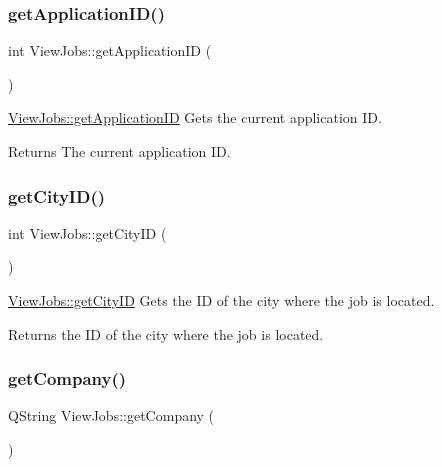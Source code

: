\subsubsection{\texorpdfstring{get\+Application\+I\+D()}{getApplicationID()}}
{\footnotesize\ttfamily int View\+Jobs\+::get\+Application\+ID (\begin{DoxyParamCaption}{ }\end{DoxyParamCaption})}



\hyperlink{class_view_jobs_a086650882ad80acb4074cf697f8cddcb}{View\+Jobs\+::get\+Application\+ID} Gets the current application ID. 

\begin{DoxyReturn}{Returns}
The current application ID. 
\end{DoxyReturn}
\mbox{\label{class_view_jobs_adcafeca350b21a033aa630e042ee7947}} 
\subsubsection{\texorpdfstring{get\+City\+I\+D()}{getCityID()}}
{\footnotesize\ttfamily int View\+Jobs\+::get\+City\+ID (\begin{DoxyParamCaption}{ }\end{DoxyParamCaption})}



\hyperlink{class_view_jobs_adcafeca350b21a033aa630e042ee7947}{View\+Jobs\+::get\+City\+ID} Gets the ID of the city where the job is located. 

\begin{DoxyReturn}{Returns}
the ID of the city where the job is located. 
\end{DoxyReturn}
\mbox{\label{class_view_jobs_a88d7c0a7a79bc7a7e02b524587983bf8}} 
\subsubsection{\texorpdfstring{get\+Company()}{getCompany()}}
{\footnotesize\ttfamily Q\+String View\+Jobs\+::get\+Company (\begin{DoxyParamCaption}{ }\end{DoxyParamCaption})}



